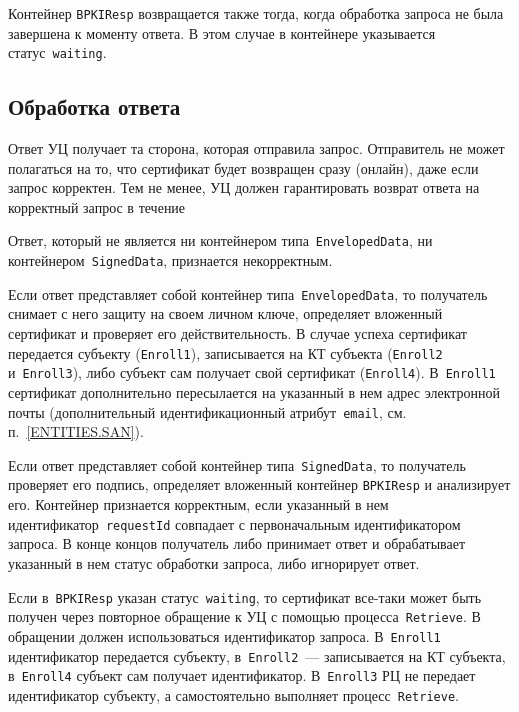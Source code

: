 
Контейнер \texttt{BPKIResp} возвращается также тогда,
когда обработка запроса не была завершена к моменту ответа.
В этом случае в контейнере указывается статус~\texttt{waiting}.

\subsection{Обработка ответа}\label{PROCESSES.Enroll.Finish}

Ответ УЦ получает та сторона, которая отправила запрос.
Отправитель не может полагаться на то, что сертификат
будет возвращен сразу (онлайн), даже если запрос корректен.
%
Тем не менее, УЦ должен гарантировать возврат ответа на корректный запрос  
в течение  

Ответ, который не является ни контейнером типа~\texttt{EnvelopedData},
ни контейнером~\texttt{SignedData}, признается некорректным.

Если ответ представляет собой контейнер типа~\texttt{EnvelopedData}, 
то получатель снимает с него защиту на своем личном ключе, определяет 
вложенный сертификат и проверяет его действительность. 
%
В случае успеха сертификат передается субъекту (\texttt{Enroll1}),
записывается на КТ субъекта (\texttt{Enroll2} и~\texttt{Enroll3}),
либо субъект сам получает свой сертификат (\texttt{Enroll4}).
%
В~\texttt{Enroll1} сертификат дополнительно пересылается на указанный в 
нем адрес электронной почты (дополнительный идентификационный 
атрибут~\texttt{email}, см. п.~\ref{ENTITIES.SAN}). 

Если ответ представляет собой контейнер типа~\texttt{SignedData}, 
то получатель проверяет его подпись, определяет вложенный контейнер 
\texttt{BPKIResp} и анализирует его. Контейнер признается
корректным, если указанный в нем идентификатор~\texttt{requestId}
совпадает с первоначальным идентификатором запроса.
%
В конце концов получатель либо принимает ответ и обрабатывает указанный 
в нем статус обработки запроса, либо игнорирует ответ.

Если в~\texttt{BPKIResp} указан статус~\texttt{waiting}, то сертификат 
все-таки может быть получен через повторное обращение к УЦ с помощью 
процесса~\texttt{Retrieve}. В обращении должен использоваться 
идентификатор запроса. 
%
В~\texttt{Enroll1} идентификатор передается субъекту,
в~\texttt{Enroll2}~--- записывается на КТ субъекта,
в~\texttt{Enroll4} субъект сам получает идентификатор.
%
В~\texttt{Enroll3} РЦ не передает идентификатор субъекту, 
а самостоятельно выполняет процесс~\texttt{Retrieve}.

